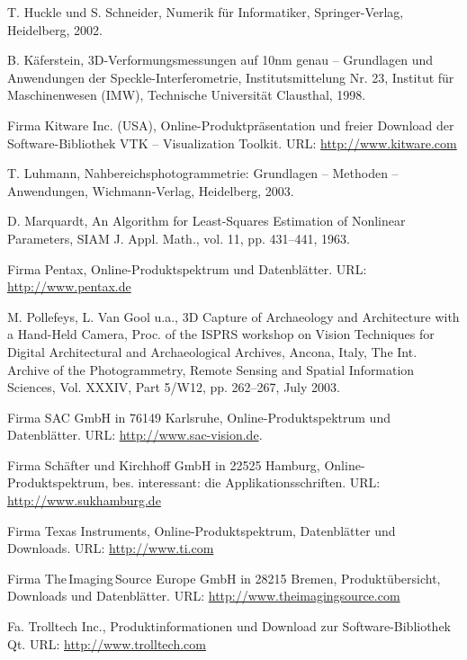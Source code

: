 \begin{thebibliography}{Ti}
 T. Huckle und S. Schneider, \glqq Numerik für Informatiker\grqq, Springer-Verlag, Heidelberg, 2002.

 B. Käferstein, \glqq 3D-Verformungsmessungen auf 10nm genau -- Grundlagen und Anwendungen der Speckle-Interferometrie\grqq, Institutsmittelung Nr. 23, Institut für Maschinenwesen (IMW), Technische Universität Clausthal, 1998.

 Firma Kitware Inc. (USA), Online-Produktpräsentation und freier Download der Software-Bibliothek VTK -- Visualization Toolkit. URL: \url{http://www.kitware.com}

 T. Luhmann, \glqq Nahbereichsphotogrammetrie: Grundlagen -- Methoden -- Anwendungen\grqq, Wichmann-Verlag, Heidelberg, 2003.

 D. Marquardt, \glqq An Algorithm for Least-Squares Estimation of Nonlinear Parameters\grqq, SIAM J. Appl. Math., vol. 11, pp. 431--441, 1963.

 Firma Pentax, Online-Produktspektrum und Datenblätter. URL: \url{http://www.pentax.de}

 M. Pollefeys, L. Van Gool u.a., \glqq3D Capture of Archaeology and Architecture with a Hand-Held Camera\grqq, Proc. of the ISPRS workshop on Vision Techniques for Digital Architectural and Archaeological Archives, Ancona, Italy, The Int. Archive of the Photogrammetry, Remote Sensing and Spatial Information Sciences, Vol. XXXIV, Part 5/W12, pp. 262--267, July 2003.

 Firma SAC GmbH in 76149 Karlsruhe, Online-Produktspektrum und Datenblätter. URL: \url{http://www.sac-vision.de}.

 Firma Schäfter und Kirchhoff GmbH in 22525 Hamburg,
Online-Produktspektrum, bes. interessant: die Applikationsschriften. URL:
\url{http://www.sukhamburg.de}

 Firma Texas Instruments, Online-Produktspektrum, Datenblätter und Downloads. URL: \url{http://www.ti.com}

 Firma The\,Imaging\,Source Europe GmbH in 28215 Bremen, Produktübersicht, Downloads und Datenblätter. URL: \url{http://www.theimagingsource.com}


 Fa. Trolltech Inc., Produktinformationen und Download zur Software-Bibliothek Qt. URL: \url{http://www.trolltech.com}


\end{thebibliography}
